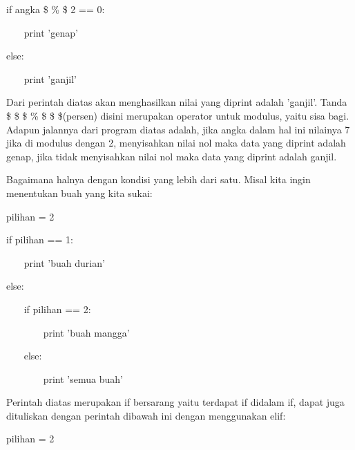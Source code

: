 if angka  \$  \%  \$ 2 == 0: \par
\vspace{12pt}
\noindent 
~~~ print 'genap' \par
\vspace{12pt}
\noindent 
else: \par
\vspace{12pt}
\noindent 
~~~ print 'ganjil' \par
\vspace{12pt}
\noindent 
Dari perintah diatas akan menghasilkan nilai yang diprint adalah 'ganjil'. Tanda \$  \$ \$  \%  \$ \$  \$(persen) disini merupakan operator untuk modulus, yaitu sisa bagi. Adapun jalannya dari program diatas adalah, jika angka dalam hal ini nilainya 7 jika di modulus dengan 2, menyisahkan nilai nol maka data yang diprint adalah genap, jika tidak menyisahkan nilai nol maka data yang diprint adalah ganjil. \par
\vspace{12pt}
\noindent 
Bagaimana halnya dengan kondisi yang lebih dari satu. Misal kita ingin menentukan buah yang kita sukai: \par
\vspace{12pt}
\noindent 
pilihan = 2 \par
\vspace{12pt}
\noindent 
if pilihan == 1: \par
\vspace{12pt}
\noindent 
~~~ print 'buah durian' \par
\vspace{12pt}
\noindent 
else: \par
\vspace{12pt}
\noindent 
~~~ if pilihan == 2: \par
\vspace{12pt}
\noindent 
~~~~~~~ print 'buah mangga' \par
\vspace{12pt}
\noindent 
~~~ else: \par
\vspace{12pt}
\noindent 
~~~~~~~ print 'semua buah' \par
\vspace{12pt}
\noindent 
Perintah diatas merupakan if bersarang yaitu terdapat if didalam if, dapat juga dituliskan dengan perintah dibawah ini dengan menggunakan $  $elif: \par
\vspace{12pt}
\noindent 
pilihan = 2 \par
\vspace{12pt}
